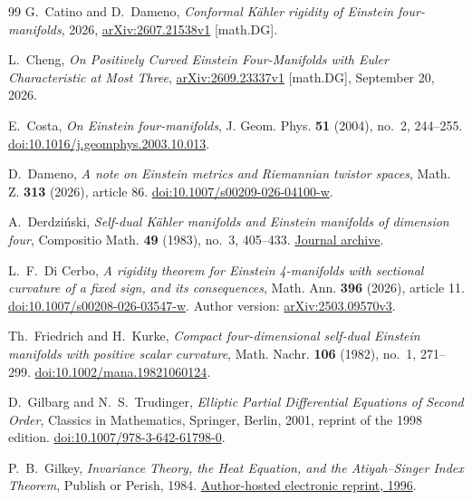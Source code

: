 \begin{thebibliography}{99}
G.~Catino and D.~Dameno, \emph{Conformal K\"ahler rigidity of Einstein four-manifolds}, 2026, \href{https://arxiv.org/abs/2607.21538v1}{arXiv:2607.21538v1} [math.DG].

L.~Cheng, \emph{On Positively Curved Einstein Four-Manifolds with Euler Characteristic at Most Three}, \href{https://arxiv.org/abs/2609.23337v1}{arXiv:2609.23337v1} [math.DG], September 20, 2026.

E.~Costa, \emph{On Einstein four-manifolds}, J. Geom. Phys. \textbf{51} (2004), no.~2, 244--255.
\href{https://doi.org/10.1016/j.geomphys.2003.10.013}{doi:10.1016/j.geomphys.2003.10.013}.

D.~Dameno, \emph{A note on Einstein metrics and Riemannian twistor spaces}, Math. Z. \textbf{313} (2026), article 86.
\href{https://doi.org/10.1007/s00209-026-04100-w}{doi:10.1007/s00209-026-04100-w}.

A.~Derdzi\'nski, \emph{Self-dual K\"ahler manifolds and Einstein manifolds of dimension four}, Compositio Math. \textbf{49} (1983), no.~3, 405--433. \href{https://www.numdam.org/item/CM_1983__49_3_405_0/}{Journal archive}.

L.~F.~Di Cerbo, \emph{A rigidity theorem for Einstein 4-manifolds with sectional curvature of a fixed sign, and its consequences}, Math. Ann. \textbf{396} (2026), article 11.
\href{https://doi.org/10.1007/s00208-026-03547-w}{doi:10.1007/s00208-026-03547-w}.
Author version: \href{https://arxiv.org/abs/2503.09570v3}{arXiv:2503.09570v3}.

Th.~Friedrich and H.~Kurke,
\emph{Compact four-dimensional self-dual Einstein manifolds with positive scalar curvature},
Math. Nachr. \textbf{106} (1982), no.~1, 271--299.
\href{https://doi.org/10.1002/mana.19821060124}{doi:10.1002/mana.19821060124}.

D.~Gilbarg and N.~S.~Trudinger, \emph{Elliptic Partial Differential Equations of Second Order}, Classics in Mathematics, Springer, Berlin, 2001, reprint of the 1998 edition.
\href{https://doi.org/10.1007/978-3-642-61798-0}{doi:10.1007/978-3-642-61798-0}.

P.~B.~Gilkey, \emph{Invariance Theory, the Heat Equation, and the Atiyah--Singer Index Theorem}, Publish or Perish, 1984. \href{https://pages.uoregon.edu/gilkey/dirPDF/InvarianceTheory1Ed.pdf}{Author-hosted electronic reprint, 1996}.


\end{thebibliography}
